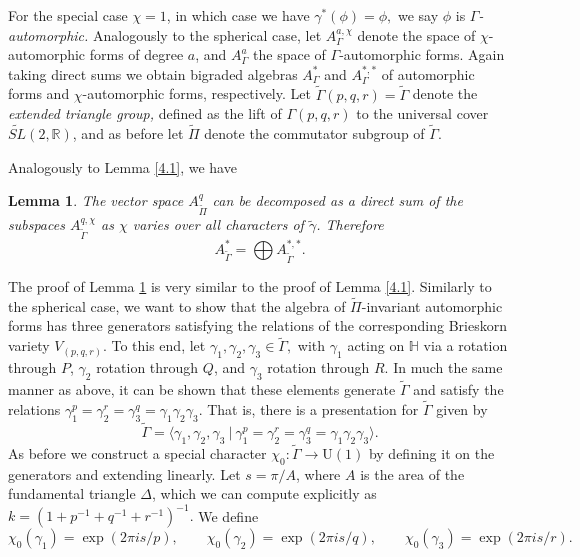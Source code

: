 \documentclass{article}
\newtheorem{lemma}{Lemma}[section]
\begin{document}
For the special case $\chi=1$, in which case we have $\gamma^*(\phi) = \phi,$ we say $\phi$ is $\Gamma$\textit{-automorphic.} Analogously to the spherical case, let $A_\Gamma^{a, \chi}$ denote the space of $\chi$-automorphic forms of degree $a$, and $A_\Gamma^a$ the space of $\Gamma$-automorphic forms. Again taking direct sums we obtain bigraded algebras $A_\Gamma^*$ and $A_\Gamma^{*,*}$ of automorphic forms and $\chi$-automorphic forms, respectively. Let $\widetilde{\Gamma}(p,q,r) = \widetilde{\Gamma}$ denote the \textit{extended triangle group,} defined as the lift of $\Gamma(p,q,r)$ to the universal cover $\widetilde{SL}(2,\mathbb{R})$, and as before let $\widetilde{\Pi}$ denote the commutator subgroup of $\widetilde{\Gamma}$.

Analogously to Lemma \ref{4.1}, we have
\begin{lemma}
\label{4.4}
The vector space $A^q_{\widetilde{\Pi}}$ can be decomposed as a direct sum of the subspaces $A_{\tilde{\Gamma}}^{q, \chi}$ as $\chi$ varies over all characters of $\widetilde{\gamma}$. Therefore
\[A^*_{\widetilde{\Gamma}} = \bigoplus A_{\widetilde{\Gamma}}^{\ast, \ast}.\]
\end{lemma}
The proof of Lemma \ref{4.4} is very similar to the proof of Lemma \ref{4.1}. Similarly to the spherical case, we want to show that the algebra of $\widetilde{\Pi}$-invariant automorphic forms has three generators satisfying the relations of the corresponding Brieskorn variety $V_{(p,q,r)}$. To this end, let $\gamma_1, \gamma_2, \gamma_3 \in \widetilde{\Gamma},$ with $\gamma_1$ acting on $\mathbb{H}$ via a rotation through $P$, $\gamma_2$ rotation through $Q$, and $\gamma_3$ rotation through $R$. In much the same manner as above, it can be shown that these elements generate $\widetilde{\Gamma}$ and satisfy the relations $\gamma_1^p = \gamma_2^r = \gamma_3^q = \gamma_1 \gamma_2 \gamma_3$. That is, there is a presentation for $\widetilde{\Gamma}$ given by
\[\widetilde{\Gamma} = \langle\gamma_1, \gamma_2, \gamma_3\ |\ \gamma_1^p = \gamma_2^r = \gamma_3^q = \gamma_1 \gamma_2 \gamma_3\rangle.\]
As before we construct a special character $\chi_0 : \widetilde{\Gamma} \to \mathrm{U}(1)$ by defining it on the generators and extending linearly. Let $s = \pi/A$, where $A$ is the area of the fundamental triangle $\Delta$,  which we can compute explicitly as $k = (1 + p^{-1} + q^{-1} + r^{-1})^{-1}.$ We define 
\[\chi_0(\gamma_1) = \exp(2 \pi i s/p), \qquad \chi_0(\gamma_2) = \exp(2 \pi i s/q), \qquad \chi_0(\gamma_3) = \exp(2 \pi i s/r).\]
\end{document}
